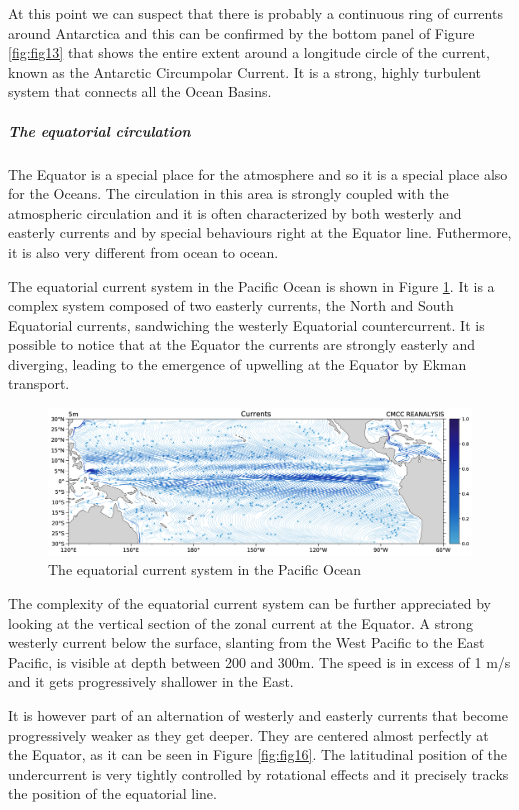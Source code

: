 At this point we can suspect that there is probably a continuous ring of currents around Antarctica and this can be confirmed by the bottom panel of Figure \ref{fig:fig13}  that shows the entire extent around a
longitude circle of the current, known as the Antarctic Circumpolar
Current. It is a strong, highly turbulent system that connects all the
Ocean Basins.
\\

\subparagraph{The equatorial
	circulation}

The Equator is a special place for the atmosphere and so it is a special
place also for the Oceans. The circulation in this area is strongly
coupled with the atmospheric circulation and it is often characterized
by both westerly and easterly currents and by special behaviours right
at the Equator line. Futhermore, it is also very different from ocean to
ocean.

The equatorial current system in the Pacific Ocean is shown in Figure \ref{fig:fig14}. It is a complex system composed of two easterly
currents, the North and South Equatorial currents, sandwiching the
westerly Equatorial countercurrent. It is possible to notice that at the
Equator the currents are strongly easterly and diverging, leading to the
emergence of upwelling at the Equator by Ekman transport.

\begin{figure}[htpb]
	\centering
	\includegraphics[width = 0.4 \textwidth]{uploads/39image.png}
	\caption{The equatorial current system in the Pacific Ocean} \label{fig:fig14}
\end{figure}

The complexity of the equatorial current system can be further
appreciated by looking at the vertical section of the zonal current at
the Equator. A strong westerly current below the
surface, slanting from the West Pacific to the East Pacific, is visible
at depth between 200 and 300m. The speed is in excess of 1 m/s and it
gets progressively shallower in the East.

It is however part of an alternation of westerly and easterly currents
that become progressively weaker as they get deeper. They are centered
almost perfectly at the Equator, as it can be seen in Figure \ref{fig:fig16}. The latitudinal position of the undercurrent is very tightly controlled by rotational effects and it precisely tracks the position of the equatorial line.


